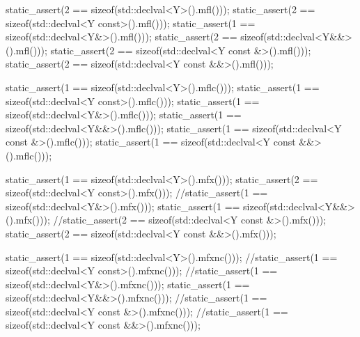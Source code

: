 \documentclass[ebook,11pt,article]{memoir}
\begin{document}
\begin{codeblock}
static_assert(2 == sizeof(std::declval<Y>().mfl()));
static_assert(2 == sizeof(std::declval<Y const>().mfl()));
static_assert(1 == sizeof(std::declval<Y&>().mfl()));
static_assert(2 == sizeof(std::declval<Y&&>().mfl()));
static_assert(2 == sizeof(std::declval<Y const &>().mfl()));
static_assert(2 == sizeof(std::declval<Y const &&>().mfl()));

static_assert(1 == sizeof(std::declval<Y>().mflc()));
static_assert(1 == sizeof(std::declval<Y const>().mflc()));
static_assert(1 == sizeof(std::declval<Y&>().mflc()));
static_assert(1 == sizeof(std::declval<Y&&>().mflc()));
static_assert(1 == sizeof(std::declval<Y const &>().mflc()));
static_assert(1 == sizeof(std::declval<Y const &&>().mflc()));


static_assert(1 == sizeof(std::declval<Y>().mfx()));
static_assert(2 == sizeof(std::declval<Y const>().mfx()));
//static_assert(1 == sizeof(std::declval<Y\&>().mfx()));
static_assert(1 == sizeof(std::declval<Y&&>().mfx()));
//static_assert(2 == sizeof(std::declval<Y const \&>().mfx()));
static_assert(2 == sizeof(std::declval<Y const &&>().mfx()));

static_assert(1 == sizeof(std::declval<Y>().mfxnc()));
//static_assert(1 == sizeof(std::declval<Y const>().mfxnc()));
//static_assert(1 == sizeof(std::declval<Y\&>().mfxnc()));
static_assert(1 == sizeof(std::declval<Y&&>().mfxnc()));
//static_assert(1 == sizeof(std::declval<Y const \&>().mfxnc()));
//static_assert(1 == sizeof(std::declval<Y const \&\&>().mfxnc()));
\end{codeblock}
 
\end{document}
